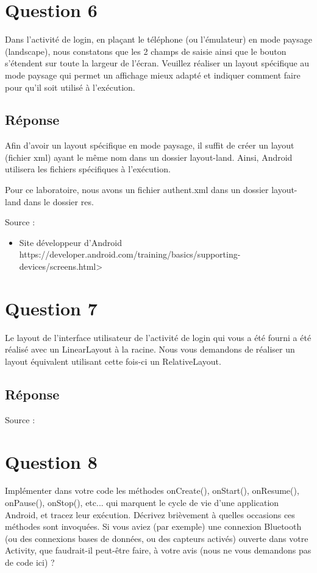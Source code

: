 \documentclass[francais,12pt]{article}
\begin{document}
		
	\section*{Question 6}
		Dans l'activité de login, en plaçant le téléphone (ou l'émulateur) en mode paysage (landscape), nous constatons que les 2 champs de saisie ainsi que le bouton s'étendent sur toute la largeur de l'écran. Veuillez réaliser un layout spécifique au mode paysage qui permet un affichage mieux adapté et indiquer comment faire pour qu’il soit utilisé à l’exécution.  
		
		\subsection*{Réponse}
        Afin d'avoir un layout spécifique en mode paysage, il suffit de créer un layout (fichier xml) ayant le même nom dans un dossier layout-land. Ainsi, Android utilisera les fichiers spécifiques à l'exécution.
        
        Pour ce laboratoire, nous avons un fichier authent.xml dans un dossier layout-land dans le dossier res.
		
		Source :
    	\begin{itemize}
            \item Site développeur d'Android \newline
             https://developer.android.com/training/basics/supporting-devices/screens.html>
        \end{itemize}
		
	\section*{Question 7}
		Le layout de l’interface utilisateur de l’activité de login qui vous a été fourni a été réalisé avec un LinearLayout à la racine. Nous vous demandons de réaliser un layout équivalent utilisant cette fois-ci un RelativeLayout.  
		
		\subsection*{Réponse}
		
		Source :
		
	\section*{Question 8}
		Implémenter dans votre code les méthodes onCreate(), onStart(), onResume(), onPause(), onStop(), etc... qui marquent le cycle de vie d'une application Android, et tracez leur exécution. Décrivez brièvement à quelles occasions ces méthodes sont invoquées. Si vous aviez (par exemple) une connexion Bluetooth (ou des connexions bases de données, ou des capteurs activés) ouverte dans votre Activity, que faudrait-il peut-être faire, à votre avis (nous ne vous demandons pas de code ici) ? 
		
\end{document}
